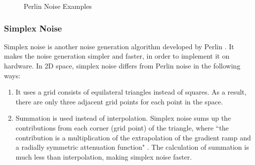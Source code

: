 \begin{figure}
	\center
	\caption{Perlin Noise Examples}
	\label{fig:perlinEg}
\end{figure}

\subsubsection{Simplex Noise}
Simplex noise is another noise generation algorithm developed by Perlin \cite{perlin:2001}. It makes the noise generation simpler and faster, in order to implement it on hardware. In 2D space, simplex noise differs from Perlin noise in the following ways:
\begin{enumerate}
	\item It uses a grid consists of equilateral triangles instead of squares. As a result, there are only three adjacent grid points for each point in the space.
	\item Summation is used instead of interpolation. Simplex noise sums up the contributions from each corner (grid point) of the triangle, where ``the contribution is a multiplication of the extrapolation of the gradient ramp and a radially symmetric attenuation function" \cite{Gustavson2005}. The calculation of summation is much less than interpolation, making simplex noise faster.
\end{enumerate}

